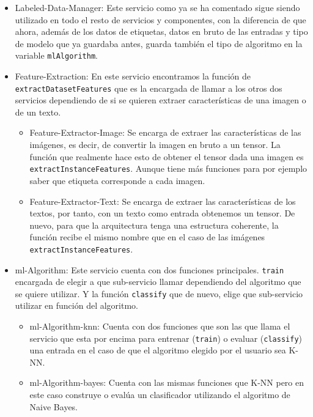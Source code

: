 \documentclass[a4paper, 12pt]{book}
\begin{document}
\begin{itemize}
  
	\item Labeled-Data-Manager: Este servicio como ya se ha comentado sigue siendo utilizado en todo el resto de servicios y componentes, con la diferencia de que ahora, además de los datos de etiquetas, datos en bruto de las entradas y tipo de modelo que ya guardaba antes, guarda también el tipo de algoritmo en la variable \texttt{mlAlgorithm}.
 
	\item Feature-Extraction: En este servicio encontramos la función de \texttt{extractDatasetFeatures} que es la encargada de llamar a los otros dos servicios dependiendo de si se quieren extraer características de una imagen o de un texto.
\begin{itemize}
  
	\item Feature-Extractor-Image: Se encarga de extraer las características de las imágenes, es decir, de convertir la imagen en bruto a un tensor. La función que realmente hace esto de obtener el tensor dada una imagen es \texttt{extractInstanceFeatures}. Aunque tiene más funciones para por ejemplo saber que etiqueta corresponde a cada imagen.

	\item Feature-Extractor-Text: Se encarga de extraer las características de los textos, por tanto, con un texto como entrada obtenemos un tensor. De nuevo, para que la arquitectura tenga una estructura coherente, la función recibe el mismo nombre que en el caso de las imágenes \texttt{extractInstanceFeatures}. 
\end{itemize}

	\item ml-Algorithm: Este servicio cuenta con dos funciones principales. \texttt{train} encargada de elegir a que sub-servicio llamar dependiendo del algoritmo que se quiere utilizar. Y la función \texttt{classify} que de nuevo, elige que sub-servicio utilizar en función del algoritmo.
\begin{itemize}
  
	\item ml-Algorithm-knn: Cuenta con dos funciones que son las que llama el servicio que esta por encima para entrenar (\texttt{train}) o evaluar  (\texttt{classify}) una entrada en el caso de que el algoritmo elegido por el usuario sea K-NN.

	\item ml-Algorithm-bayes: Cuenta con las mismas funciones que K-NN pero en este caso construye o evalúa un clasificador utilizando el algoritmo de Naive Bayes.
\end{itemize}


\end{itemize}
\end{document}
